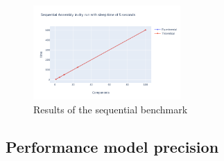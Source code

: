 


\begin{figure}[h]
  \begin{center}
    \includegraphics[width=0.5\textwidth]{./images/evaluations_dryrun_seq.png}
    \caption{Results of the sequential benchmark}
    \label{fig:dryrunseq}
  \end{center}
\end{figure}



\subsection{Performance model precision}


